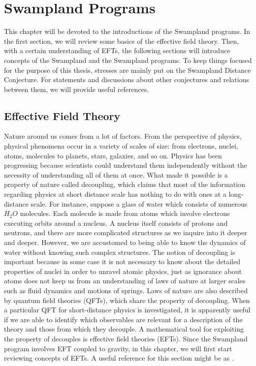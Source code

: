 \chapter{Swampland Programs}
\label{Chapter1}
This chapter will be devoted to the introductions of the Swampland programs. In the first section, we will review some basics of the effective field theory. Then, with a certain understanding of EFTs, the following sections will introduce concepts of the Swampland and the Swampland programs. To keep things focused for the purpose of this thesis, stresses are mainly put on the Swampland Distance Conjecture. For statements and discussions about other conjectures and relations between them, we will provide useful references.
\section{Effective Field Theory}
Nature around us comes from a lot of factors. From the perspective of physics, physical phenomena occur in a variety of scales of size: from electrons, nuclei, atoms, molecules to planets, stars, galaxies, and so on. Physics has been progressing because scientists could understand them independently without the necessity of understanding all of them at once. What made it possible is a property of nature called decoupling, which claims that most of the information regarding physics at short distance scale has nothing to do with ones at a long-distance scale. For instance, suppose a glass of water which consists of numerous $H_{2} O$ molecules. Each molecule is made from atoms which involve electrons executing orbits around a nucleus. A nucleus itself consists of protons and neutrons, and there are more complicated structures as we inquire into it deeper and deeper. However, we are accustomed to being able to know the dynamics of water without knowing such complex structures. The notion of decoupling is important because in some case it is not necessary to know about the detailed properties of nuclei in order to unravel atomic physics, just as ignorance about atoms does not keep us from an understanding of laws of nature at larger scales such as fluid dynamics and motions of springs. Laws of nature are also described by quantum field theories (QFTs), which share the property of decoupling. When a particular QFT for short-distance physics is investigated, it is apparently useful if we are able to identify which observables are relevant for a description of the theory and those from which they decouple. A mathematical tool for exploiting the property of decouples is effective field theories (EFTs). Since the Swampland program involves EFT coupled to gravity, in this chapter, we will first start reviewing concepts of EFTs. A useful reference for this section might be as \parencite{burgess_introduction_2020}. 
